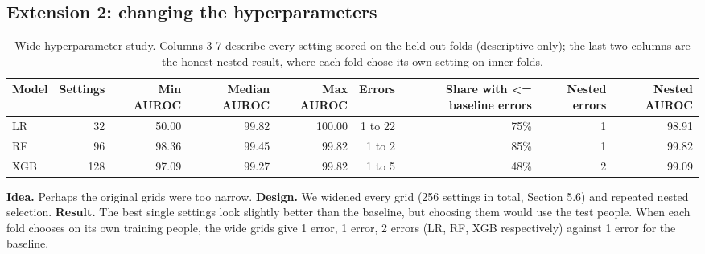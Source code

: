 \documentclass[11pt,a4paper]{article}
\begin{document}
\subsection{Extension 2: changing the hyperparameters}\label{sec:ext2}
\begin{table}[H]\centering\scriptsize\renewcommand{\arraystretch}{1.15}
\caption{Wide hyperparameter study. Columns 3-7 describe every setting scored on the held-out folds (descriptive only); the last two columns are the honest nested result, where each fold chose its own setting on inner folds.}
\begin{adjustbox}{max width=\linewidth}\begin{tabular}{lrrrrrrrr}
\toprule
\textbf{Model} & \textbf{Settings} & \textbf{Min AUROC} & \textbf{Median AUROC} & \textbf{Max AUROC} & \textbf{Errors} & \textbf{Share with <= baseline errors} & \textbf{Nested errors} & \textbf{Nested AUROC}\\
\midrule
LR & 32 & 50.00 & 99.82 & 100.00 & 1 to 22 & 75\% & 1 & 98.91\\
RF & 96 & 98.36 & 99.45 & 99.82 & 1 to 2 & 85\% & 1 & 99.82\\
XGB & 128 & 97.09 & 99.27 & 99.82 & 1 to 5 & 48\% & 2 & 99.09\\
\bottomrule
\end{tabular}\end{adjustbox}\end{table}
\textbf{Idea.} Perhaps the original grids were too narrow. \textbf{Design.} We widened every grid (256 settings in total, Section 5.6) and repeated nested selection. \textbf{Result.} The best single settings look slightly better than the baseline, but choosing them would use the test people. When each fold chooses on its own training people, the wide grids give 1 error, 1 error, 2 errors (LR, RF, XGB respectively) against 1 error for the baseline.
\end{document}
